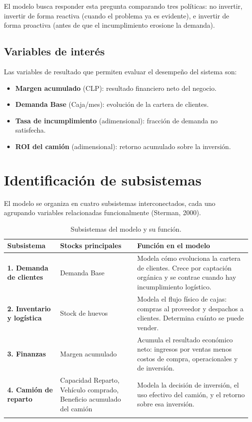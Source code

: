 \documentclass[10pt,a4paper]{article}
\begin{document}
El modelo busca responder esta pregunta comparando tres políticas: no invertir, invertir de forma reactiva (cuando el problema ya es evidente), e invertir de forma proactiva (antes de que el incumplimiento erosione la demanda).

\subsection{Variables de interés}

Las variables de resultado que permiten evaluar el desempeño del sistema son:

\begin{itemize}
  \item \textbf{Margen acumulado} (CLP): resultado financiero neto del negocio.
  \item \textbf{Demanda Base} (Caja/mes): evolución de la cartera de clientes.
  \item \textbf{Tasa de incumplimiento} (adimensional): fracción de demanda no satisfecha.
  \item \textbf{ROI del camión} (adimensional): retorno acumulado sobre la inversión.
\end{itemize}

\newpage

\section{Identificación de subsistemas}

El modelo se organiza en cuatro subsistemas interconectados, cada uno agrupando variables relacionadas funcionalmente (Sterman, 2000).

\begin{longtable}{>{\bfseries}p{3.5cm} p{4.5cm} p{6cm}}
\toprule
Subsistema & Stocks principales & Función en el modelo \\
\midrule
\endhead
1. Demanda de clientes & Demanda Base & Modela cómo evoluciona la cartera de clientes. Crece por captación orgánica y se contrae cuando hay incumplimiento logístico. \\[6pt]
2. Inventario y logística & Stock de huevos & Modela el flujo físico de cajas: compras al proveedor y despachos a clientes. Determina cuánto se puede vender. \\[6pt]
3. Finanzas & Margen acumulado & Acumula el resultado económico neto: ingresos por ventas menos costos de compra, operacionales y de inversión. \\[6pt]
4. Camión de reparto & Capacidad Reparto, Vehículo comprado, Beneficio acumulado del camión & Modela la decisión de inversión, el uso efectivo del camión, y el retorno sobre esa inversión. \\
\bottomrule
\caption{Subsistemas del modelo y su función.}
\end{longtable}
\end{document}
